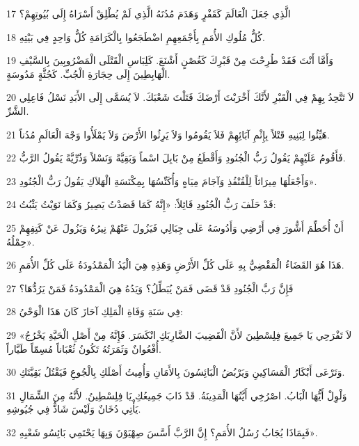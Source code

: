 \par 17 الَّذِي جَعَلَ الْعَالَمَ كَقَفْرٍ وَهَدَمَ مُدُنَهُ الَّذِي لَمْ يُطْلِقْ أَسْرَاهُ إِلَى بُيُوتِهِمْ؟
\par 18 كُلُّ مُلُوكِ الأُمَمِ بِأَجْمَعِهِمِ اضْطَجَعُوا بِالْكَرَامَةِ كُلُّ وَاحِدٍ فِي بَيْتِهِ.
\par 19 وَأَمَّا أَنْتَ فَقَدْ طُرِحْتَ مِنْ قَبْرِكَ كَغُصْنٍ أَشْنَعَ. كَلِبَاسِ الْقَتْلَى الْمَضْرُوبِينَ بِالسَّيْفِ الْهَابِطِينَ إِلَى حِجَارَةِ الْجُبِّ. كَجُثَّةٍ مَدُوسَةٍ.
\par 20 لاَ تَتَّحِدُ بِهِمْ فِي الْقَبْرِ لأَنَّكَ أَخْرَبْتَ أَرْضَكَ قَتَلْتَ شَعْبَكَ. لاَ يُسَمَّى إِلَى الأَبَدِ نَسْلُ فَاعِلِي الشَّرِّ.
\par 21 هَيِّئُوا لِبَنِيهِ قَتْلاً بِإِثْمِ آبَائِهِمْ فَلاَ يَقُومُوا وَلاَ يَرِثُوا الأَرْضَ وَلاَ يَمْلَأُوا وَجْهَ الْعَالَمِ مُدُناً.
\par 22 فَأَقُومُ عَلَيْهِمْ يَقُولُ رَبُّ الْجُنُودِ وَأَقْطَعُ مِنْ بَابِلَ اسْماً وَبَقِيَّةً وَنَسْلاً وَذُرِّيَّةً يَقُولُ الرَّبُّ.
\par 23 وَأَجْعَلُهَا مِيرَاثاً لِلْقُنْفُذِ وَآجَامَ مِيَاهٍ وَأُكَنِّسُهَا بِمِكْنَسَةِ الْهَلاَكِ يَقُولُ رَبُّ الْجُنُودِ».
\par 24 قَدْ حَلَفَ رَبُّ الْجُنُودِ قَائِلاً: «إِنَّهُ كَمَا قَصَدْتُ يَصِيرُ وَكَمَا نَوَيْتُ يَثْبُتُ:
\par 25 أَنْ أُحَطِّمَ أَشُّورَ فِي أَرْضِي وَأَدُوسَهُ عَلَى جِبَالِي فَيَزُولَ عَنْهُمْ نِيرُهُ وَيَزُولَ عَنْ كَتِفِهِمْ حِمْلُهُ».
\par 26 هَذَا هُوَ القَضَاءُ الْمَقْضِيُّ بِهِ عَلَى كُلِّ الأَرْضِ وَهَذِهِ هِيَ الْيَدُ الْمَمْدُودَةُ عَلَى كُلِّ الأُمَمِ.
\par 27 فَإِنَّ رَبَّ الْجُنُودِ قَدْ قَضَى فَمَنْ يُبَطِّلُ؟ وَيَدُهُ هِيَ الْمَمْدُودَةُ فَمَنْ يَرُدُّهَا؟
\par 28 فِي سَنَةِ وَفَاةِ الْمَلِكِ آحَازَ كَانَ هَذَا الْوَحْيُ:
\par 29 «لاَ تَفْرَحِي يَا جَمِيعَ فِلِسْطِينَ لأَنَّ الْقَضِيبَ الضَّارِبَكِ انْكَسَرَ. فَإِنَّهُ مِنْ أَصْلِ الْحَيَّةِ يَخْرُجُ أُفْعُوانٌ وَثَمَرَتُهُ تَكُونُ ثُعْبَاناً مُسِمّاً طَيَّاراً.
\par 30 وَتَرْعَى أَبْكَارُ الْمَسَاكِينِ وَيَرْبُضُ الْبَائِسُونَ بِالأَمَانِ وَأُمِيتُ أَصْلَكِ بِالْجُوعِ فَيَقْتُلُ بَقِيَّتَكِ.
\par 31 وَلْوِلْ أَيُّهَا الْبَابُ. اصْرُخِي أَيَّتُهَا الْمَدِينَةُ. قَدْ ذَابَ جَمِيعُكِ يَا فِلِسْطِينُ. لأَنَّهُ مِنَ الشِّمَالِ يَأْتِي دُخَانٌ وَلَيْسَ شَاذٌّ فِي جُيُوشِهِ.
\par 32 فَبِمَاذَا يُجَابُ رُسُلُ الأُمَمِ؟ إِنَّ الرَّبَّ أَسَّسَ صِهْيَوْنَ وَبِهَا يَحْتَمِي بَائِسُو شَعْبِهِ».

